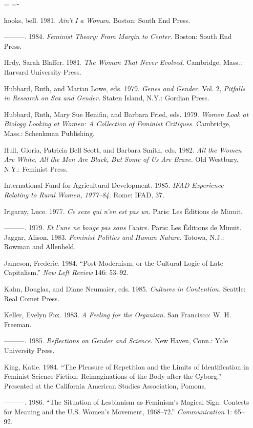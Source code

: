 \documentclass[DIV=12,%
               BCOR=10mm,%
               headinclude=false,%
               footinclude=false,open=any,%
               fontsize=11pt,%
               twoside,%
               paper=210mm:11in]%
               {scrbook}
\newenvironment*{amusebiblio}{
  \leftskip=\parindent
  \parindent=-\parindent
  \smallskip
  \indent
}{\smallskip}
\begin{document}
\begin{amusebiblio}
hooks, bell. 1981. \emph{Ain’t I a Woman.} Boston: South End Press.


———. 1984. \emph{Feminist Theory: From Margin to Center.} Boston: South End Press.


Hrdy, Sarah Blaffer. 1981. \emph{The Woman That Never Evolved.} Cambridge, Mass.: Harvard University Press.


Hubbard, Ruth, and Marian Lowe, eds. 1979. \emph{Genes and Gender.} Vol. 2, \emph{Pitfalls in Research on Sex and Gender.} Staten Island, N.Y.: Gordian Press.


Hubbard, Ruth, Mary Sue Henifin, and Barbara Fried, eds. 1979. \emph{Women Look at Biology Looking at Women: A Collection of Feminist Critiques.} Cambridge, Mass.: Schenkman Publishing.


Hull, Gloria, Patricia Bell Scott, and Barbara Smith, eds. 1982. \emph{All the Women Are White, All the Men Are Black, But Some of Us Are Brave.} Old Westbury, N.Y.: Feminist Press.


International Fund for Agricultural Development. 1985. \emph{IFAD Experience Relating to Rural Women, 1977–84.} Rome: IFAD, 37.


Irigaray, Luce. 1977. \emph{Ce sexe qui n’en est pas un.} Paris: Les Éditions de Minuit.


———. 1979. \emph{Et l’une ne bouge pas sans l’autre.} Paris: Les Éditions de Minuit. Jaggar, Alison. 1983. \emph{Feminist Politics and Human Nature}. Totowa, N.J.: Rowman and Allenheld.


Jameson, Frederic. 1984. “Post-Modernism, or the Cultural Logic of Late Capitalism.” \emph{New Left Review} 146: 53–92.


Kahn, Douglas, and Diane Neumaier, eds. 1985. \emph{Cultures in Contention.} Seattle: Real Comet Press.


Keller, Evelyn Fox. 1983. \emph{A Feeling for the Organism.} San Francisco: W. H. Freeman.


———. 1985. \emph{Reflections on Gender and Science.} New Haven, Conn.: Yale University Press.


King, Katie. 1984. “The Pleasure of Repetition and the Limits of Identification in Feminist Science Fiction: Reimaginations of the Body after the Cyborg.” Presented at the California American Studies Association, Pomona.


———. 1986. “The Situation of Lesbianism as Feminism’s Magical Sign: Contests for Meaning and the U.S. Women’s Movement, 1968–72.” \emph{Communication} 1: 65–92.



\end{amusebiblio}
\end{document}
